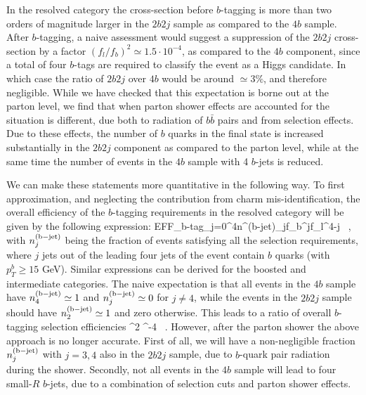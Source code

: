 In the resolved category 
the cross-section  before
$b$-tagging is more than two orders
of magnitude larger in the $2b2j$
sample as compared to the $4b$ sample.
%
After $b$-tagging, a naive assessment would
suggest a suppression of the $2b2j$ cross-section by a factor $(f_l/f_b)^2 \simeq
1.5\cdot 10^{-4}$, as compared to the $4b$ component,
since a total of four $b$-tags are required to classify the
event as a Higgs candidate.
%
In which case the ratio of $2b2j$ over $4b$ would be
around $\simeq 3\%$, and therefore negligible.
While  we have checked that this expectation is borne
out at the parton level,
we find that  when parton shower effects
are accounted for the situation is different, due both to radiation of $b\bar{b}$ pairs
and from selection effects.
%
Due to these effects,
the
number of  $b$ quarks in the  final state is
increased substantially in the $2b2j$ component as compared
to the parton level, while at the same
time the number of events in the $4b$ sample
with 4 $b$-jets is reduced.


We can make these statements more quantitative in the following way.
%
To first approximation, and neglecting the contribution from
charm mis-identification,
the
overall efficiency of the $b$-tagging requirements in the resolved category will be
given by the following expression:
\be
\label{btaggingeff}
{\rm EFF}_{\rm b-tag}\simeq \sum_{j=0}^{4}n^{\rm (b-jet)}_j\cdot f_b^{j}\cdot f_l^{4-j} \, ,
\ee
with $n^{\rm (b-jet)}_j$ being the fraction of events satisfying all the selection
requirements,
where $j$ jets out of the leading four jets of the event
contain $b$ quarks (with $p_T^b\ge 15$
GeV).
%
Similar expressions can be derived for
the boosted and intermediate categories.
%
The naive expectation is that all events in the $4b$ sample have $n^{\rm (b-jet)}_4\simeq 1$
and $n^{\rm (b-jet)}_j\simeq 0$ for $j\ne 4$, while the events in the $2b2j$ sample
should have $n^{\rm (b-jet)}_2\simeq 1$ and zero otherwise.
%
This leads to a ratio of overall $b$-tagging selection efficiencies
\be
\label{eq:naive}
  \simeq
 \lp {}\rp^2 ^{-4} \, .
\ee
However, after the parton shower the above approach is no longer accurate.
%
First of all, we will have a non-negligible fraction $n^{\rm (b-jet)}_j$
with $j=3,4$ also in the $2b2j$ sample, due to $b$-quark pair radiation
during the shower.
%
Secondly, not all events in the $4b$ sample will lead to four small-$R$ $b$-jets,
due to a combination of selection cuts and
parton shower effects.
%

